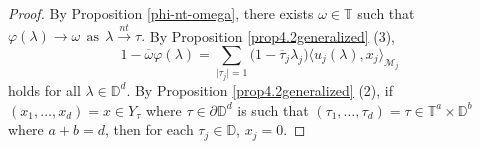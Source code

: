 \documentclass[11pt, reqno]{amsart}
\newcommand\1{\boldsymbol {1}}
\numberwithin{equation}{section}
\begin{document}
\begin{proof}
 By Proposition \ref{phi-nt-omega},
there exists $\omega\in\mathbb{T}$ such that $\varphi(\lambda)\rightarrow \omega~~\text{as}~~\lambda{\overset{nt}\rightarrow}\tau.$ By Proposition \ref{prop4.2generalized} (3), 
\begin{equation}\label{omega-model}
  1-\overline{\omega}\varphi(\lambda)=\sum_{\lvert \tau_{j} \rvert = 1}\Big(1-\overline{\tau}_{j}\lambda_{j}\Big)\langle u_{j}(\lambda),x_{j}\rangle_{\mathcal{M}_{j}}
  \end{equation}
holds for all $\lambda\in\mathbb{D}^{d}$.
By Proposition \ref{prop4.2generalized} (2), if $(x_{1},\hdots,x_{d})=x\in Y_{\tau}$ where $\tau\in\partial\mathbb{D}^{d}$ is such that  $(\tau_{1},\hdots,\tau_{d})=\tau\in\mathbb{T}^{a}\times\mathbb{D}^{b}$ where $a+b=d$, then for each $\tau_{j}\in\mathbb{D}$, $x_{j}=0$.


\end{proof}
\end{document}
